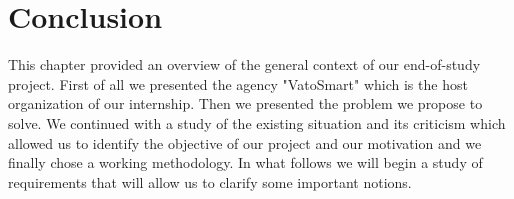 \section*{Conclusion}
    This chapter provided an overview of the general context of our end-of-study project. First of all we presented the agency "VatoSmart" which is the host organization of our internship. Then we presented the problem we propose to solve. We continued with a study of the existing situation and its criticism which allowed us to identify the objective of our project and our motivation and we finally chose a working methodology.
In what follows we will begin a study of requirements that will allow us to clarify some important notions.   